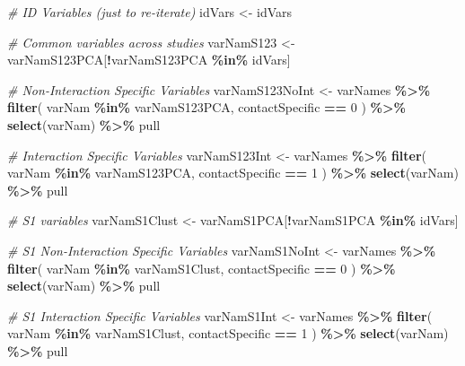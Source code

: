 \documentclass[
]{article}
\newenvironment{Shaded}{\begin{snugshade}}{\end{snugshade}}
\newcommand{\CommentTok}[1]{\textcolor[rgb]{0.56,0.35,0.01}{\textit{#1}}}
\newcommand{\DecValTok}[1]{\textcolor[rgb]{0.00,0.00,0.81}{#1}}
\newcommand{\FunctionTok}[1]{\textcolor[rgb]{0.13,0.29,0.53}{\textbf{#1}}}
\newcommand{\NormalTok}[1]{#1}
\newcommand{\OtherTok}[1]{\textcolor[rgb]{0.56,0.35,0.01}{#1}}
\newcommand{\SpecialCharTok}[1]{\textcolor[rgb]{0.81,0.36,0.00}{\textbf{#1}}}
\begin{document}
\begin{Shaded}
\begin{Highlighting}[]
\CommentTok{\# ID Variables (just to re{-}iterate)}
\NormalTok{idVars }\OtherTok{\textless{}{-}}\NormalTok{ idVars}

\CommentTok{\# Common variables across studies }
\NormalTok{varNamS123 }\OtherTok{\textless{}{-}}\NormalTok{ varNamS123PCA[}\SpecialCharTok{!}\NormalTok{varNamS123PCA }\SpecialCharTok{\%in\%}\NormalTok{ idVars]}

\CommentTok{\# Non{-}Interaction Specific Variables}
\NormalTok{varNamS123NoInt }\OtherTok{\textless{}{-}}\NormalTok{ varNames }\SpecialCharTok{\%\textgreater{}\%}
  \FunctionTok{filter}\NormalTok{(}
\NormalTok{    varNam }\SpecialCharTok{\%in\%}\NormalTok{ varNamS123PCA,}
\NormalTok{    contactSpecific }\SpecialCharTok{==} \DecValTok{0}
\NormalTok{  ) }\SpecialCharTok{\%\textgreater{}\%}
  \FunctionTok{select}\NormalTok{(varNam) }\SpecialCharTok{\%\textgreater{}\%}
\NormalTok{  pull}

\CommentTok{\# Interaction Specific Variables}
\NormalTok{varNamS123Int }\OtherTok{\textless{}{-}}\NormalTok{ varNames }\SpecialCharTok{\%\textgreater{}\%}
  \FunctionTok{filter}\NormalTok{(}
\NormalTok{    varNam }\SpecialCharTok{\%in\%}\NormalTok{ varNamS123PCA,}
\NormalTok{    contactSpecific }\SpecialCharTok{==} \DecValTok{1}
\NormalTok{  ) }\SpecialCharTok{\%\textgreater{}\%}
  \FunctionTok{select}\NormalTok{(varNam) }\SpecialCharTok{\%\textgreater{}\%}
\NormalTok{  pull}

\CommentTok{\# S1 variables}
\NormalTok{varNamS1Clust }\OtherTok{\textless{}{-}}\NormalTok{ varNamS1PCA[}\SpecialCharTok{!}\NormalTok{varNamS1PCA }\SpecialCharTok{\%in\%}\NormalTok{ idVars]}

\CommentTok{\# S1 Non{-}Interaction Specific Variables}
\NormalTok{varNamS1NoInt }\OtherTok{\textless{}{-}}\NormalTok{ varNames }\SpecialCharTok{\%\textgreater{}\%}
  \FunctionTok{filter}\NormalTok{(}
\NormalTok{    varNam }\SpecialCharTok{\%in\%}\NormalTok{ varNamS1Clust,}
\NormalTok{    contactSpecific }\SpecialCharTok{==} \DecValTok{0}
\NormalTok{  ) }\SpecialCharTok{\%\textgreater{}\%}
  \FunctionTok{select}\NormalTok{(varNam) }\SpecialCharTok{\%\textgreater{}\%}
\NormalTok{  pull}

\CommentTok{\# S1 Interaction Specific Variables}
\NormalTok{varNamS1Int }\OtherTok{\textless{}{-}}\NormalTok{ varNames }\SpecialCharTok{\%\textgreater{}\%}
  \FunctionTok{filter}\NormalTok{(}
\NormalTok{    varNam }\SpecialCharTok{\%in\%}\NormalTok{ varNamS1Clust,}
\NormalTok{    contactSpecific }\SpecialCharTok{==} \DecValTok{1}
\NormalTok{  ) }\SpecialCharTok{\%\textgreater{}\%}
  \FunctionTok{select}\NormalTok{(varNam) }\SpecialCharTok{\%\textgreater{}\%}
\NormalTok{  pull}



\end{Highlighting}
\end{Shaded}
\end{document}
